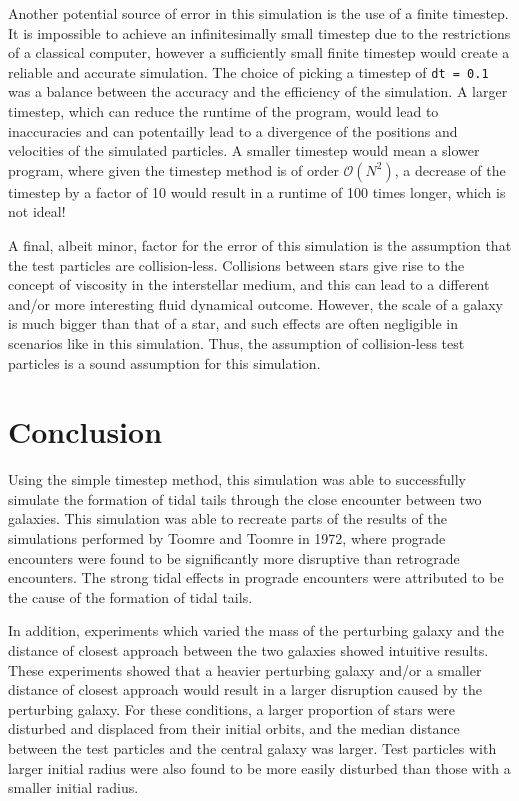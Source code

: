 \documentclass[twoside,twocolumn]{article}
\begin{document}
        Another potential source of error in this simulation is the use of a finite timestep. It is impossible to achieve an infinitesimally small timestep due to the restrictions of a classical computer, however a sufficiently small finite timestep would create a reliable and accurate simulation. The choice of picking a timestep of \texttt{dt = 0.1} was a balance between the accuracy and the efficiency of the simulation. A larger timestep, which can reduce the runtime of the program, would lead to inaccuracies and can potentailly lead to a divergence of the positions and velocities of the simulated particles. A smaller timestep would mean a slower program, where given the timestep method is of order $\mathcal{O}(N^2)$, a decrease of the timestep by a factor of 10 would result in a runtime of 100 times longer, which is not ideal!

        A final, albeit minor, factor for the error of this simulation is the assumption that the test particles are collision-less. Collisions between stars give rise to the concept of viscosity in the interstellar medium, and this can lead to a different and/or more interesting fluid dynamical outcome. However, the scale of a galaxy is much bigger than that of a star, and such effects are often negligible in scenarios like in this simulation. Thus, the assumption of collision-less test particles is a sound assumption for this simulation. 

\section{Conclusion}

        Using the simple timestep method, this simulation was able to successfully simulate the formation of tidal tails through the close encounter between two galaxies. This simulation was able to recreate parts of the results of the simulations performed by Toomre and Toomre in 1972, where prograde encounters were found to be significantly more disruptive than retrograde encounters. The strong tidal effects in prograde encounters were attributed to be the cause of the formation of tidal tails.

        In addition, experiments which varied the mass of the perturbing galaxy and the distance of closest approach between the two galaxies showed intuitive results. These experiments showed that a heavier perturbing galaxy and/or a smaller distance of closest approach would result in a larger disruption caused by the perturbing galaxy. For these conditions, a larger proportion of stars were disturbed and displaced from their initial orbits, and the median distance between the test particles and the central galaxy was larger. Test particles with larger initial radius were also found to be more easily disturbed than those with a smaller initial radius.  
\end{document}
